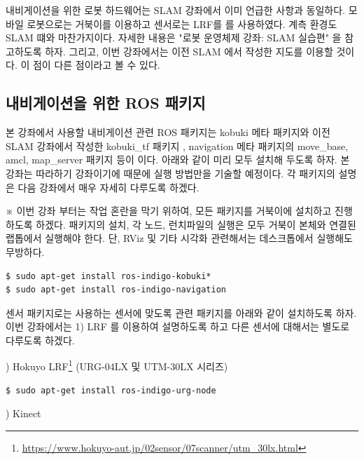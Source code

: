 내비게이션을 위한 로봇 하드웨어는 SLAM 강좌에서 이미 언급한 사항과 동일하다. 모바일 로봇으로는 거북이를 이용하고 센서로는 LRF를 를 사용하였다. 계측 환경도 SLAM 떄와 마찬가지이다. 자세한 내용은  "로봇 운영체제 강좌: SLAM 실습편" 을 참고하도록 하자. 그리고, 이번 강좌에서는 이전 SLAM 에서 작성한 지도를 이용할 것이다. 이 점이 다른 점이라고 볼 수 있다.

\subsection{내비게이션을 위한 ROS 패키지}

본 강좌에서 사용할 내비게이션 관련 ROS 패키지는 kobuki 메타 패키지와 이전 SLAM 강좌에서 작성한 kobuki\_tf 패키지 , navigation 메타 패키지의 move\_base, amcl, map\_server 패키지 등이 이다. 아래와 같이 미리 모두 설치해 두도록 하자. 본 강좌는 따라하기 강좌이기에 때문에 실행 방법만을 기술할 예정이다. 각 패키지의 설명은 다음 강좌에서 매우 자세히 다루도록 하겠다. 

※ 이번 강좌 부터는 작업 혼란을 막기 위하여, 모든 패키지를 거북이에 설치하고 진행하도록 하겠다. 패키지의 설치, 각 노드, 런치파일의 실행은 모두 거북이 본체와 연결된 랩톱에서 실행해야 한다. 단, RViz 및 기타 시각화 관련해서는 데스크톱에서 실행해도 무방하다.

\vspace{\baselineskip}
\begin{lstlisting}[language=ROS]
$ sudo apt-get install ros-indigo-kobuki*
$ sudo apt-get install ros-indigo-navigation
\end{lstlisting}

센서 패키지로는 사용하는 센서에 맞도록 관련 패키지를 아래와 같이 설치하도록 하자. 이번 강좌에서는 1) LRF 를 이용하여 설명하도록 하고 다른 센서에 대해서는 별도로 다루도록 하겠다.

\setcounter{num}{0}

\vspace{\baselineskip}
\noindent
{}
\thenum) Hokuyo LRF\footnote{\url{https://www.hokuyo-aut.jp/02sensor/07scanner/utm_30lx.html}} (URG-04LX 및 UTM-30LX 시리즈)

\vspace{\baselineskip}
\begin{lstlisting}[language=ROS]
$ sudo apt-get install ros-indigo-urg-node
\end{lstlisting}
 
\vspace{\baselineskip}
\noindent
{}
\thenum) Kinect

